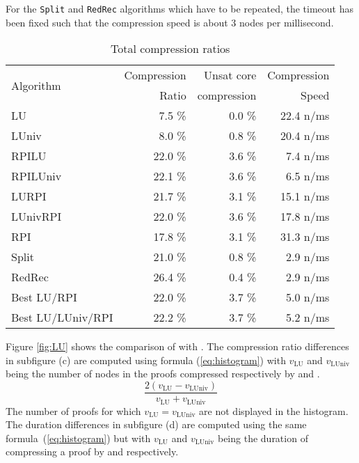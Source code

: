 \documentclass{llncs}
\begin{document}
For the \texttt{Split} and \texttt{RedRec} algorithms which have to be repeated, the timeout has
been fixed such that the compression speed is about 3 nodes per millisecond. 


\begin{table}[tb]
  \caption{Total compression ratios}
  \label{tab:average}
  \centering
  \begin{tabular}{lrrr}
    \toprule
    \multirow{2}{*}{Algorithm} & Compression & Unsat core  & Compression \\
                               &       Ratio & compression &       Speed \\
    \midrule
    LU                &  7.5 \% &  0.0 \% & 22.4 n/ms \\
    LUniv             &  8.0 \% &  0.8 \% & 20.4 n/ms \\
    RPILU             & 22.0 \% &  3.6 \% &  7.4 n/ms \\
    RPILUniv          & 22.1 \% &  3.6 \% &  6.5 n/ms \\
    LURPI             & 21.7 \% &  3.1 \% & 15.1 n/ms \\
    LUnivRPI          & 22.0 \% &  3.6 \% & 17.8 n/ms \\
    RPI               & 17.8 \% &  3.1 \% & 31.3 n/ms \\
    Split             & 21.0 \% &  0.8 \% &  2.9 n/ms \\
    RedRec           & 26.4 \% &  0.4 \% &  2.9 n/ms \\
    Best LU/RPI       & 22.0 \% &  3.7 \% &  5.0 n/ms \\
    Best LU/LUniv/RPI & 22.2 \% &  3.7 \% &  5.2 n/ms \\
    \bottomrule
  \end{tabular}
\end{table}

\newcommand{\va}[1]{\ensuremath{v_{\text{#1}}}}

Figure \ref{fig:LU} shows the comparison of {\LowerUnits} with {\LowerUnivalents}. The compression
ratio differences in subfigure (c) are computed using formula (\ref{eq:histogram}) with \va{LU}
and \va{LUniv} being the number of nodes in the proofs compressed respectively by {\LowerUnits} and
{\LowerUnivalents}.
\begin{equation} \label{eq:histogram}
  \frac { 2(\va{LU} - \va{LUniv}) }{ \va{LU} + \va{LUniv} }
\end{equation}
The number of proofs for which $\va{LU} = \va{LUniv}$ are not displayed in the histogram.
The duration differences in subfigure (d) are computed using the same formula~(\ref{eq:histogram}) but
with \va{LU} and \va{LUniv} being the duration of compressing a proof by {\LowerUnits} and
{\LowerUnits} respectively.
\end{document}
